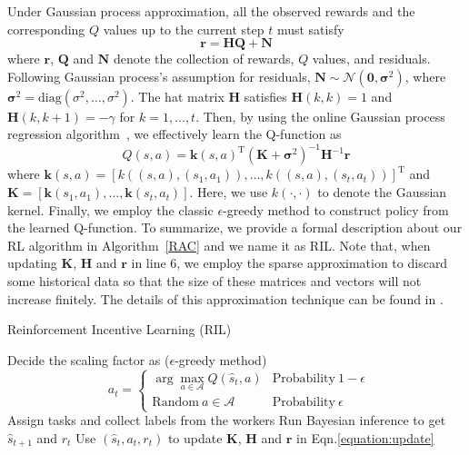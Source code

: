 Under Gaussian process approximation, all the observed rewards and the corresponding $Q$ values up to the current step $t$ must satisfy
\begin{equation}
\bm{r}=\bm{H}\bm{Q}+\bm{N}
\end{equation}
where $\bm{r}$, $\bm{Q}$ and $\bm{N}$ denote the collection of rewards, $Q$ values, and residuals. Following Gaussian process's assumption for residuals, $\bm{N}\sim \mathcal{N}(\bm{0},\bm{\sigma}^2)$, where $\bm{\sigma}^2=\textrm{diag}(\sigma^2,\ldots,\sigma^2)$.
The hat matrix $\bm{H}$ satisfies $\bm{H}(k,k)=1$ and $\bm{H}(k,k+1)=-\gamma$ for $k=1,\ldots, t$.
Then, by using the online Gaussian process regression algorithm~\cite{engel2005reinforcement}, we effectively learn the Q-function as
\begin{equation}
\label{equation:update}
Q(s,a) = \bm{k}(s,a) ^{\mathrm{T}}(\bm{K} +\bm{\sigma}^2)^{-1}\bm{H}^{-1}\bm{r}
\end{equation}
where $\bm{k}(s,a)=[k((s,a), (s_1,a_1)),\ldots, k((s,a), (s_t,a_t))]^{\mathrm{T}}$ and $\bm{K}=[\bm{k}(s_1,a_1),\ldots,\bm{k}(s_t,a_t)]$. Here, we use $k(\cdot, \cdot)$ to denote the Gaussian kernel.
Finally, we employ the classic $\epsilon$-greedy method to construct policy from the learned Q-function.
To summarize, we provide a formal description about our RL algorithm in Algorithm~\ref{RAC} and we name it as RIL.
Note that, when updating $\bm{K}$, $\bm{H}$ and $\bm{r}$ in line 6, we employ the sparse approximation to discard some historical data so that the size of these matrices and vectors will not increase finitely. The details of this approximation technique can be found in \citet{gasic2014gaussian}.

\begin{algorithm}[tb]
   \caption{Reinforcement Incentive Learning (RIL)}
   \label{RAC}
   \small
\begin{algorithmic}[1]
   \STATE Decide the scaling factor as ($\epsilon$-greedy method)
			$$\ \ a_t=\left\{
			\begin{array}{ll}
				\arg\max_{a\in\mathcal{A}}Q(\hat{s}_t,a) & \mathrm{Probability\ } 1-\epsilon\\
				\mathrm{Random\ } a\in\mathcal{A} & \mathrm{Probability\ } \epsilon
			\end{array}						
			 \right.$$   
   \STATE Assign tasks and collect labels from the workers
   \STATE Run Bayesian inference to get $\hat{s}_{t+1}$ and $r_t$
   \STATE Use $(\hat{s}_t, a_t, r_t)$ to update $\bm{K}$, $\bm{H}$ and $\bm{r}$ in Eqn.\ref{equation:update}
   \ENDFOR
   \ENDFOR
\end{algorithmic}
\end{algorithm}


